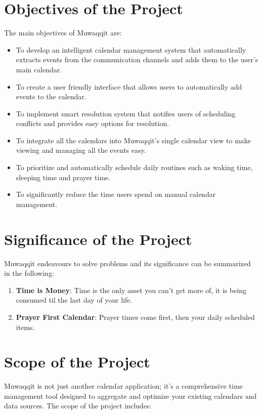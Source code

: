 \documentclass[12pt,a4paper]{article}
\begin{document}
\section{Objectives of the Project}

The main objectives of Muwaqqit are:

\begin{itemize}
    \item To develop an intelligent calendar management system that automatically extracts events from the communication channels and adds them to the user's main calendar.
    \item To create a user friendly interface that allows users to automatically add events to the calendar.
    \item To implement smart resolution system that notifies users of scheduling conflicts and provides easy options for resolution.
    \item To integrate all the calendars into Muwaqqit's single calendar view to make viewing and managing all the events easy.
    \item To prioritize and automatically schedule daily routines such as waking time, sleeping time and prayer time.
    \item To significantly reduce the time users spend on manual calendar management.
\end{itemize}

\section{Significance of the Project}

Muwaqqit endeavours to solve problems and its significance can be summarized in the following:

\begin{enumerate}
    \item \textbf{Time is Money}: Time is the only asset you can't get more of, it is being consumed til the last day of your life.
    \item \textbf{Prayer First Calendar}: Prayer times come first, then your daily scheduled items.
\end{enumerate}

\section{Scope of the Project}

Muwaqqit is not just another calendar application; it's a comprehensive time management tool designed to aggregate and optimize your existing calendars and data sources. The scope of the project includes:
\end{document}
